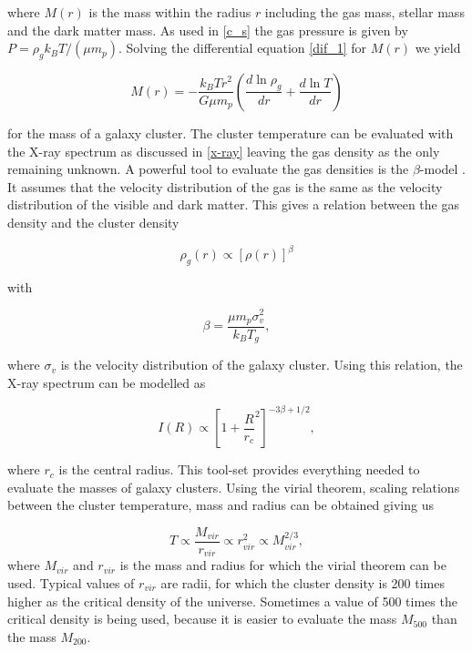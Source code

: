 where $M(r)$ is the mass within the radius $r$ including the gas mass, stellar mass and the dark matter mass. As used in \eqref{c_s} the gas pressure is given by $P = \rho_g k_B T/(\mu m_p)$. Solving the differential equation \eqref{dif_1} for $M(r)$ we yield 

\begin{equation}
    M(r) = - \frac{k_B T r^2}{G\mu m_p}\left( \frac{d\ln \rho_g}{dr} + \frac{d\ln T}{dr} \right)
\end{equation}

for the mass of a galaxy cluster. The cluster temperature can be evaluated with the X-ray spectrum as discussed in \cref{x-ray} leaving the gas density as the only remaining unknown. A powerful tool to evaluate the gas densities is the $\beta$-model \citep{Cavaliere_1976}. 
It assumes that the velocity distribution of the gas is the same as the velocity distribution of the visible and dark matter. This gives a relation between the gas density and the cluster density

\begin{equation}
    \rho_g (r) \propto \left[ \rho (r) \right]^{\beta}
\end{equation}

with

\begin{equation}
    \beta = \frac{\mu m_p \sigma_v^2}{k_BT_g},
\end{equation}

where $\sigma_v$ is the velocity distribution of the galaxy cluster. Using this relation, the X-ray spectrum can be modelled as

\begin{equation}
    I(R) \propto \left[ 1 + \frac{R}{r_c}^2 \right]^{-3\beta + 1/2},
\end{equation}

where $r_c$ is the central radius.
This tool-set provides everything needed to evaluate the masses of galaxy clusters. Using the virial theorem, scaling relations between the cluster temperature, mass and radius can be obtained giving us

\begin{equation}
    T \propto \frac{M_{vir}}{r_{vir}} \propto r^2_{vir} \propto M^{2/3}_{vir},
\end{equation}
where $M_{vir}$ and $r_{vir}$ is the mass and radius for which the virial theorem can be used. Typical values of $r_{vir}$ are radii, for which the cluster density is 200 times higher as the critical density of the universe. Sometimes a value of 500 times the critical density is being used, because it is easier to evaluate the mass $M_{500}$ than the mass $M_{200}$.
\\


